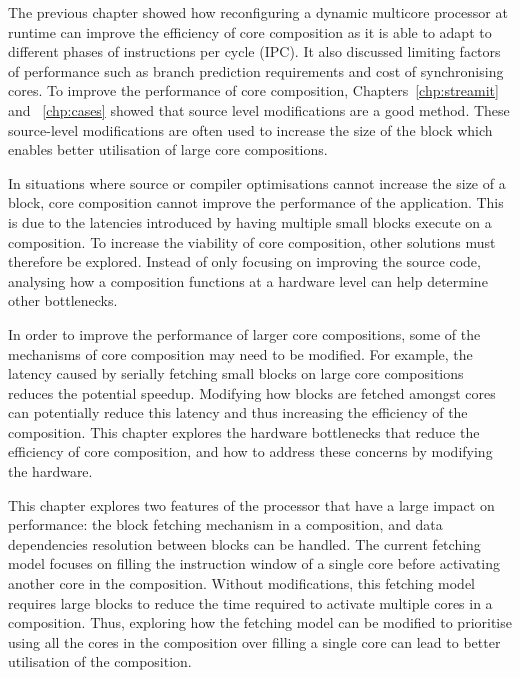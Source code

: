 The previous chapter showed how reconfiguring a dynamic multicore processor at runtime can improve the efficiency of core composition as it is able to adapt to different phases of instructions per cycle (IPC).
It also discussed limiting factors of performance such as branch prediction requirements and cost of synchronising cores.
To improve the performance of core composition, Chapters~\ref{chp:streamit} and ~\ref{chp:cases} showed that source level modifications are a good method.
These source-level modifications are often used to increase the size of the block which enables better utilisation of large core compositions.

In situations where source or compiler optimisations cannot increase the size of a block, core composition cannot improve the performance of the application.
This is due to the latencies introduced by having multiple small blocks execute on a composition.
To increase the viability of core composition, other solutions must therefore be explored.
Instead of only focusing on improving the source code, analysing how a composition functions at a hardware level can help determine other bottlenecks.

In order to improve the performance of larger core compositions, some of the mechanisms of core composition may need to be modified.%
For example, the latency caused by serially fetching small blocks on large core compositions reduces the potential speedup.
Modifying how blocks are fetched amongst cores can potentially reduce this latency and thus increasing the efficiency of the composition.
This chapter explores the hardware bottlenecks that reduce the efficiency of core composition, and how to address these concerns by modifying the hardware.

This chapter explores two features of the processor that have a large impact on performance: the block fetching mechanism in a composition, and data dependencies resolution between blocks can be handled.
The current fetching model focuses on filling the instruction window of a single core before activating another core in the composition.
Without modifications, this fetching model requires large blocks to reduce the time required to activate multiple cores in a composition.
Thus, exploring how the fetching model can be modified to prioritise using all the cores in the composition over filling a single core can lead to better utilisation of the composition.

